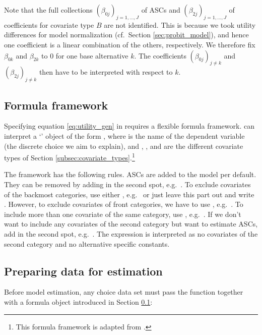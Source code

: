 \documentclass[article,shortnames]{jss}
\newcommand{\class}[1]{`\code{#1}'}
\newcommand{\fct}[1]{\code{#1()}}
\begin{document}
Note that the full collections $(\beta_{0j})_{j=1,\dots,J}$ of ASCs and $(\beta_{2j})_{j=1,\dots,J}$ of coefficients for covariate type $B$ are not identified. This is because we took utility differences for model normalization (cf.\ Section \ref{sec:probit_model}), and hence one coefficient is a linear combination of the others, respectively. We therefore fix $\beta_{0k}$ and $\beta_{2k}$ to 0 for one base alternative $k$. The coefficients $(\beta_{0j})_{j\neq k}$ and $(\beta_{2j})_{j\neq k}$ then have to be interpreted with respect to $k$.

\subsection{Formula framework} \label{subsec:formula}

Specifying equation \eqref{eq:utility_gen} in  requires a flexible formula framework.  can interpret a \class{formula} object of the form , where  is the name of the dependent variable (the discrete choice we aim to explain), and , , and  are the different covariate types of Section \ref{subsec:covariate_types}.\footnote{This formula framework is adapted from .}

The framework has the following rules. ASCs are added to the model per default. They can be removed by adding  in the second spot, e.g.\ . To exclude covariates of the backmost categories, use either , e.g.\  or just leave this part out and write . However, to exclude covariates of front categories, we have to use , e.g.\ . To include more than one covariate of the same category, use \code{+}, e.g.\ . If we don't want to include any covariates of the second category but want to estimate ASCs, add  in the second spot, e.g.\ . The expression  is interpreted as no covariates of the second category and no alternative specific constants.

\subsection{Preparing data for estimation} \label{subsec:prepare_data}

Before model estimation, any choice data set  must pass the \fct{prepare\_data} function together with a formula object  introduced in Section \ref{subsec:formula}:
\end{document}
